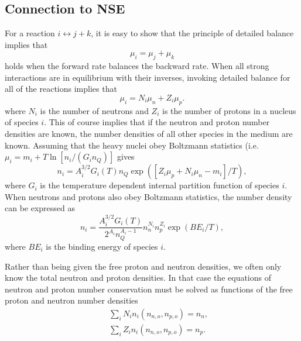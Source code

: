 \documentclass[11pt,letter]{article}
\begin{document}
\subsection{Connection to NSE} 
For a reaction $i \leftrightarrow j + k$, it is easy to show that the principle
of detailed balance implies that 
\begin{equation}
\mu_i = \mu_j + \mu_k 
\end{equation} 
holds when the forward rate balances the backward rate.  When all strong
interactions are in equilibrium with their inverses, invoking detailed balance
for all of the reactions implies that 
\begin{equation}
\mu_i = N_i \mu_n + Z_i \mu_p. 
\end{equation} 
where $N_i$ is the number of neutrons and $Z_i$ is the number of protons in a
nucleus of species $i$.
This of course implies that if the neutron and proton number densities are
known, the number densities of all other species in the medium are known.
Assuming that the heavy nuclei obey Boltzmann statistics (i.e. $\mu_i = m_i + T
\ln \left[n_i/(G_i n_Q)\right]$ gives 
\begin{equation}
n_i = A_i^{3/2} G_i(T) n_Q \exp\left(\left[Z_i \mu_p + N_i \mu_n
- m_i \right]/T\right), 
\end{equation} 
where $G_i$ is the temperature dependent internal partition function of species
$i$.  When neutrons and protons also obey Boltzmann statistics, the number
density can be expressed as 
\begin{equation} 
n_i = \frac{A_i^{3/2} G_i(T)}{2^{A_i}n_Q^{A_i-1}}  n_n^{N_i} n_p^{Z_i}
\exp(BE_i/T), 
\end{equation} 
where $BE_i$ is the binding energy of species $i$.  

Rather than being given the free proton and neutron densities, we often
only know the total neutron and proton densities.  In that case the equations of
neutron and proton number conservation must be solved as functions of the free
proton and neutron number densities
\begin{eqnarray}
&&\sum_i N_i n_i(n_{n,o}, n_{p,o}) = n_n, \\
&&\sum_i Z_i n_i(n_{n,o}, n_{p,o}) = n_p.
\end{eqnarray}  
\end{document}
